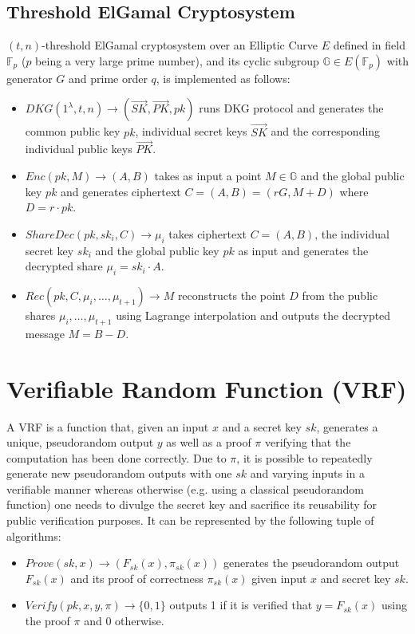 \documentclass[letterpaper,twocolumn,10pt]{article}
\theoremstyle{definition}
\theoremstyle{remark}
\begin{document}
\subsection{Threshold ElGamal Cryptosystem}
\label{appendix:elGamal}
$(t, n)$-threshold ElGamal cryptosystem \cite{desmedt1990Threshold, cherniaeva2019homomorphic} over an Elliptic Curve $E$ defined in field $\mathbb{F}_p$ ($p$ being a very large prime number), and its cyclic subgroup $\mathbb{G} \in E(\mathbb{F}_p)$ with generator $G$ and prime order $q$, is implemented as follows:
\begin{itemize}
    \item $DKG(1^\lambda, t, n) \rightarrow (\vec{SK}, \vec{PK}, pk)$ runs DKG protocol and generates the common public key $pk$, individual secret keys $\vec{SK}$ and the corresponding individual public keys $\vec{PK}$.
     \item $Enc(pk, M) \rightarrow (A, B)$  takes as input a point $M \in \mathbb{G}$ and the global public key $pk$ and generates ciphertext $C = (A, B) = (rG, M+D) $ where $D = r \cdot pk$.
     \item $ShareDec(pk, sk_i, C) \rightarrow \mu_i$ takes ciphertext $C = (A,B)$, the individual secret key $sk_i$ and the global public key $pk$ as input and generates the decrypted share $\mu_i = sk_i \cdot A$.
     \item $Rec(pk, C, \mu_i, \ldots, \mu_{t+1} ) \rightarrow M$ reconstructs the point $D$ from the public shares $\mu_i, \ldots, \mu_{t+1}$ using Lagrange interpolation and outputs the decrypted message  $M = B - D$.
\end{itemize}

\section{Verifiable Random Function (VRF)}
A VRF \cite{micali1999verifiable,dodis2005verifiable} is a function that, given an input $x$ and a secret key $sk$, generates a unique, pseudorandom output $y$ as well as a proof $\pi$ verifying that the computation has been done correctly. Due to $\pi$, it is possible to repeatedly generate new pseudorandom outputs with one $sk$ and varying inputs in a verifiable manner whereas otherwise (e.g. using a classical pseudorandom function) one needs to divulge the secret key and sacrifice its reusability for public verification purposes. It can be represented by the following tuple of algorithms:
\begin{itemize}
\item $Prove(sk, x) \rightarrow (F_{sk}(x), \pi_{sk}(x))$ generates the pseudorandom output $F_{sk}(x)$ and its proof of correctness $\pi_{sk}(x)$ given input $x$ and secret key $sk$.
\item $Verify(pk, x, y, \pi) \rightarrow \{0, 1\}$ outputs 1 if it is verified that $y = F_{sk}(x)$ using the proof $\pi$ and 0 otherwise.
\end{itemize}
\end{document}
